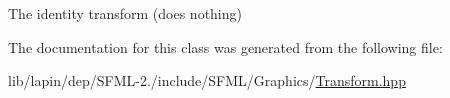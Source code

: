The identity transform (does nothing) 



The documentation for this class was generated from the following file\-:\begin{DoxyCompactItemize}
\item 
lib/lapin/dep/\-S\-F\-M\-L-\/2./include/\-S\-F\-M\-L/\-Graphics/\hyperlink{lapin_2dep_2_s_f_m_l-2_83_2include_2_s_f_m_l_2_graphics_2_transform_8hpp}{Transform.\-hpp}\end{DoxyCompactItemize}
